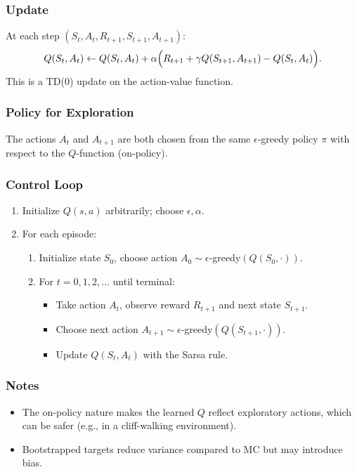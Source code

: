 \documentclass[12pt]{article}
\begin{document}
\subsubsection*{Update}
At each step $(S_t,A_t,R_{t+1},S_{t+1},A_{t+1})$:
$$
Q(S_t, A_t) \leftarrow Q(S_t, A_t) + \alpha \Bigl(R_{t+1} + \gamma Q(S_{t+1}, A_{t+1}) - Q(S_t, A_t)\Bigr).
$$
This is a TD(0) update on the action-value function.

\subsubsection*{Policy for Exploration}
The actions $A_t$ and $A_{t+1}$ are both chosen from the same $\epsilon$-greedy policy $\pi$ with respect to the $Q$-function (on-policy).

\subsubsection*{Control Loop}
\begin{enumerate}
    \item Initialize $Q(s,a)$ arbitrarily; choose $\epsilon, \alpha$.
    \item For each episode:
    \begin{enumerate}
        \item Initialize state $S_0$, choose action $A_0 \sim \epsilon$-greedy$(Q(S_0, \cdot))$.
        \item For $t=0,1,2,\dots$ until terminal:
        \begin{itemize}
            \item Take action $A_t$, observe reward $R_{t+1}$ and next state $S_{t+1}$.
            \item Choose next action $A_{t+1} \sim \epsilon$-greedy$(Q(S_{t+1}, \cdot))$.
            \item Update $Q(S_t, A_t)$ with the Sarsa rule.
        \end{itemize}
    \end{enumerate}
\end{enumerate}

\subsubsection*{Notes}
\begin{itemize}
    \item The on-policy nature makes the learned $Q$ reflect exploratory actions, which can be safer (e.g., in a cliff-walking environment).
    \item Bootstrapped targets reduce variance compared to MC but may introduce bias.
\end{itemize}
\end{document}
